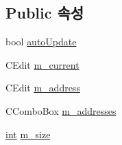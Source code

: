 \subsection*{Public 속성}
\begin{DoxyCompactItemize}
\item 
bool \mbox{\hyperlink{class_memory_viewer_dlg_a3ec3d36d4676977f8f37f55ec7f7fb39}{auto\+Update}}
\item 
C\+Edit \mbox{\hyperlink{class_memory_viewer_dlg_a857486db87e66ac05d46733b0794aec7}{m\+\_\+current}}
\item 
C\+Edit \mbox{\hyperlink{class_memory_viewer_dlg_aef3a67a90aa1b49c204d9d6a3910f13c}{m\+\_\+address}}
\item 
C\+Combo\+Box \mbox{\hyperlink{class_memory_viewer_dlg_ac61656d575927b23941090002e5ce996}{m\+\_\+addresses}}
\item 
\mbox{\hyperlink{_util_8cpp_a0ef32aa8672df19503a49fab2d0c8071}{int}} \mbox{\hyperlink{class_memory_viewer_dlg_aa24e55d166ddeecb94fea8ab7ad4d836}{m\+\_\+size}}
\end{DoxyCompactItemize}
